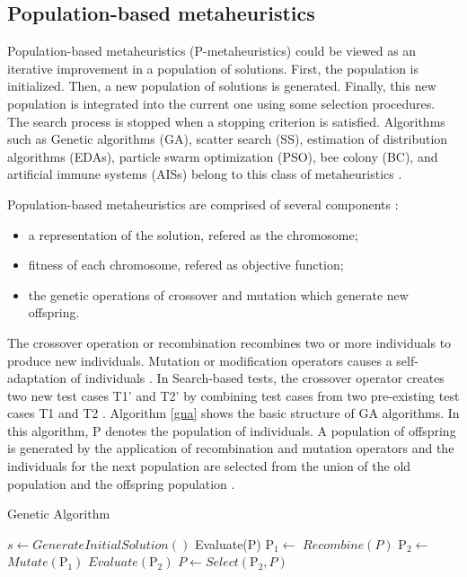 \documentclass{report}
\begin{document}
\subsection{Population-based metaheuristics}

Population-based metaheuristics (P-metaheuristics) could be viewed as an iterative improvement in a population of solutions. First, the population is initialized. Then, a new population of solutions is generated. Finally, this new population is integrated into the current one using some selection procedures. The search process is stopped when a stopping criterion is satisfied. Algorithms such as Genetic algorithms (GA), scatter search (SS), estimation of distribution algorithms (EDAs), particle swarm optimization (PSO), bee colony (BC), and artificial immune systems (AISs) belong to this class of metaheuristics \cite{talbi2009metaheuristics}.

Population-based metaheuristics are comprised of several components \cite{hong2000simultaneously} \cite{shousha2003performance} :

\begin{itemize}
\item a representation of the solution, refered as the chromosome;
\item fitness of each chromosome, refered as objective function;
\item the genetic operations of crossover and mutation which generate new offspring.
\end{itemize}

The crossover operation or recombination recombines two or more individuals to produce new individuals. Mutation or modification operators causes a self-adaptation of individuals \cite{Blum2003}. In Search-based tests, the crossover operator creates two new test cases T1' and T2' by combining test cases from two pre-existing test cases T1 and T2 \cite{Aleti2016}. Algorithm \ref{gna} shows the basic structure of GA algorithms. In this algorithm, P denotes the population of individuals. A population of offspring is generated by the application of recombination and mutation operators and the individuals for the next population are selected from the union of the old population and the offspring population \cite{raidl2010metaheuristic}.


\begin{algorithm}[h]
  \caption{Genetic Algorithm}\label{gna}
  \begin{algorithmic}[1]

    \State $s\gets GenerateInitialSolution()$
    \State Evaluate(P)
    \State $\mbox{P}_1\gets$ $Recombine(P)$
    \State $\mbox{P}_2\gets$ $Mutate(\mbox{P}_1)$
    \State $Evaluate(\mbox{P}_2)$
    \State $P\gets Select(\mbox{P}_2,P)$
    \EndWhile

  \end{algorithmic}
\end{algorithm}
\end{document}
